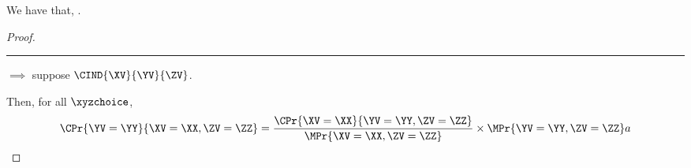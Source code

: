 \begin{proposition}
  We have that, \indsymmdef.%
\end{proposition}

\begin{proof}
  \hrule
  $\implies$ suppose $\CIND{\XV}{\YV}{\ZV}$.

  Then, for all $\xyzchoice$,
  \begin{align*}
    \CPr{\YV = \YY}{\XV = \XX, \ZV = \ZZ} &= 
    \frac{\CPr{\XV = \XX}{\YV = \YY, \ZV = \ZZ}} 
    {\MPr{\XV = \XX, \ZV = \ZZ}}
    \times 
    \MPr{\YV = \YY, \ZV = \ZZ}
    a\\
  \end{align*}
\end{proof}
